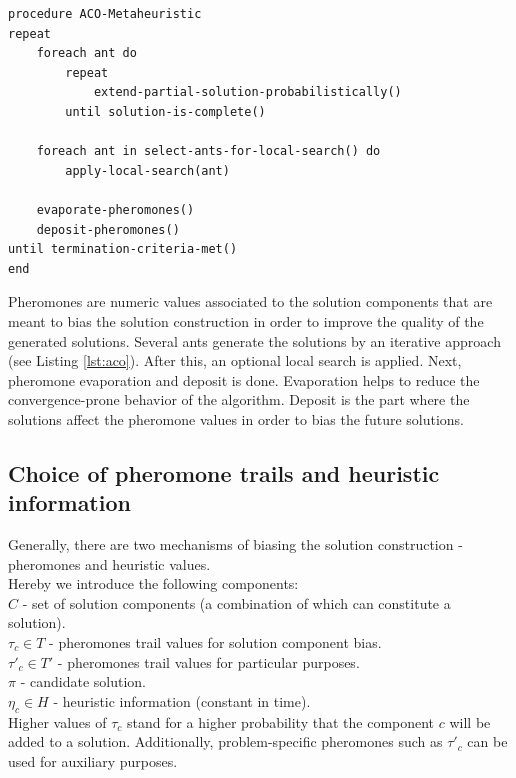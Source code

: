 \documentclass[12pt,a4paper,oneside]{book}
\begin{document}
\begin{minipage}[c]{0.95\textwidth}
\begin{lstlisting}[caption={General ACO pseudo-code}, label={lst:aco}]
procedure ACO-Metaheuristic
repeat
	foreach ant do
		repeat
			extend-partial-solution-probabilistically()
		until solution-is-complete()
	
	foreach ant in select-ants-for-local-search() do
		apply-local-search(ant)
	
	evaporate-pheromones()
	deposit-pheromones()
until termination-criteria-met()
end
\end{lstlisting}
\end{minipage}

Pheromones are numeric values associated to the solution components that are meant to bias the solution construction in order to improve the quality of the generated solutions. Several ants generate the solutions by an iterative approach (see Listing \ref{lst:aco}). After this, an optional local search is applied. Next, pheromone evaporation and deposit is done. Evaporation helps to reduce the convergence-prone behavior of the algorithm. Deposit is the part where the solutions affect the pheromone values in order to bias the future solutions.

\subsection{Choice of pheromone trails and heuristic information}

Generally, there are two mechanisms of biasing the solution construction - pheromones and heuristic values. \\
Hereby we introduce the following components: \\
$C$ - set of solution components (a combination of which can constitute a solution). \\
$\tau_c \in T$ - pheromones trail values for solution component bias. \\
$\tau'_c \in T'$ - pheromones trail values for particular purposes. \\
$\pi$ - candidate solution. \\
$\eta_c \in H$ - heuristic information (constant in time). \\

Higher values of $\tau_c$ stand for a higher probability that the component $c$ will be added to a solution. Additionally, problem-specific pheromones such as $\tau'_c$ can be used for auxiliary purposes. 
\end{document}
